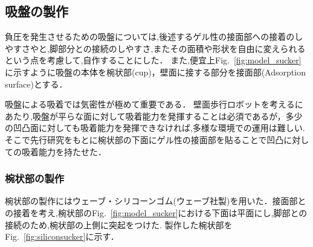 \documentclass[uplatex,dvipdfmx]{jlreq}
\begin{document}
\subsection{吸盤の製作}
負圧を発生させるための吸盤については,後述するゲル性の接面部への接着のしやすさやと,脚部分との接続のしやすさ,またその面積や形状を自由に変えられるという点を考慮して,自作することにした．
また,便宜上Fig.~\ref{fig:model_sucker}に示すように吸盤の本体を椀状部(cup)，壁面に接する部分を接面部(Adsorption surface)とする．

吸盤による吸着では気密性が極めて重要である\cite{長田勇一2016壁面}．
壁面歩行ロボットを考えるにあたり,吸盤が平らな面に対して吸着能力を発揮することは必須であるが，多少の凹凸面に対しても吸着能力を発揮できなければ,多様な環境での運用は難しい.
そこで先行研究\cite{長田勇一2016壁面}をもとに椀状部の下面にゲル性の接面部を貼ることで凹凸に対しての吸着能力を持たせた．
\subsubsection{椀状部の製作}
椀状部の製作にはウェーブ・シリコーンゴム(ウェーブ社製)を用いた．接面部との接着を考え,椀状部のFig.~\ref{fig:model_sucker}における下面は平面にし,脚部との接続のため,椀状部の上側に突起をつけた.
製作した椀状部をFig.~\ref{fig:siliconsucker}に示す．
\end{document}
